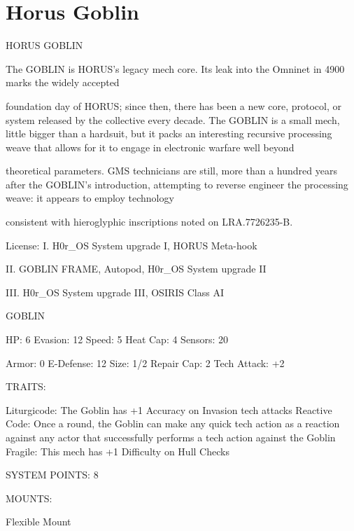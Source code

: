 \section{Horus Goblin}


                                          HORUS GOBLIN

The GOBLIN is HORUS’s legacy mech core. Its leak into the Omninet in 4900 marks the widely accepted

foundation day of HORUS; since then, there has been a new core, protocol, or system released by the
collective every decade. The GOBLIN is a small mech, little bigger than a hardsuit, but it packs an
interesting recursive processing weave that allows for it to engage in electronic warfare well beyond

theoretical parameters. GMS technicians are still, more than a hundred years after the GOBLIN’s
introduction, attempting to reverse engineer the processing weave: it appears to employ technology

consistent with hieroglyphic inscriptions noted on LRA.7726235-B.

                                                  License:
I. H0r\_OS System upgrade I, HORUS Meta-hook

II. GOBLIN FRAME, Autopod, H0r\_OS System upgrade II

III. H0r\_OS System upgrade III, OSIRIS Class AI


                                                  GOBLIN

  HP: 6          Evasion: 12                          Speed: 5           Heat Cap: 4       Sensors: 20

  Armor: 0       E-Defense: 12                        Size: 1/2          Repair Cap: 2     Tech Attack:
                                                                                           +2

                                                   TRAITS:

  Liturgicode: The Goblin has +1 Accuracy on Invasion tech attacks
  Reactive Code: Once a round, the Goblin can make any quick tech action as a reaction against
  any actor that successfully performs a tech action against the Goblin
  Fragile: This mech has +1 Difficulty on Hull Checks

                                            SYSTEM POINTS: 8

                                                  MOUNTS:

  Flexible Mount

